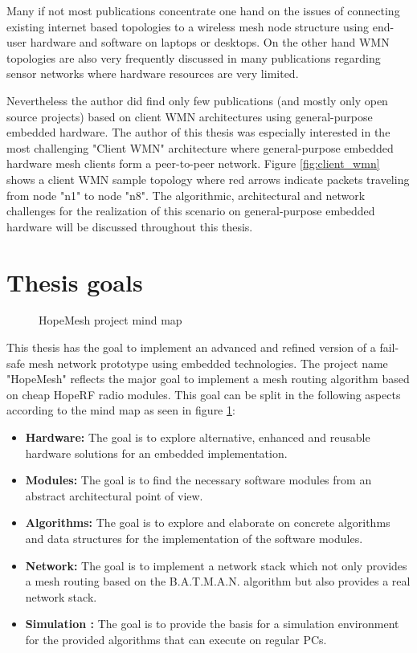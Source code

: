 Many if not most publications concentrate one hand on the issues of connecting existing internet based topologies to a wireless mesh node structure using end-user hardware and software on laptops or desktops. On the other hand WMN topologies are also very frequently discussed in many publications regarding sensor networks where hardware resources are very limited.

Nevertheless the author did find only few publications (and mostly only open source projects) based on client WMN architectures using general-purpose embedded hardware. The author of this thesis was especially interested in the most challenging "Client WMN" architecture where general-purpose embedded hardware mesh clients form a peer-to-peer network. Figure \ref{fig:client_wmn} shows a client WMN sample topology where red arrows indicate packets traveling from node "n1" to node "n8". The algorithmic, architectural and network challenges for the realization of this scenario on general-purpose embedded hardware will be discussed throughout this thesis.

\section{Thesis goals}%
\begin{figure}[H]
\begin{tikzpicture}

\end{tikzpicture}
\caption{HopeMesh project mind map}
\label{fig:mindmap}
\end{figure}

This thesis has the goal to implement an advanced and refined version of a fail-safe mesh network prototype using embedded technologies. The project name "HopeMesh" reflects the major goal to implement a mesh routing algorithm based on cheap HopeRF radio modules. This goal can be split in the following aspects according to the mind map as seen in figure \ref{fig:mindmap}:
\begin{itemize}
    \item \textbf{Hardware: } The goal is to explore alternative, enhanced and reusable hardware solutions for an embedded implementation.
    \item \textbf{Modules:} The goal is to find the necessary software modules from an abstract architectural point of view.
    \item \textbf{Algorithms:} The goal is to explore and elaborate on concrete algorithms and data structures for the implementation of the software modules.
    \item \textbf{Network:} The goal is to implement a network stack which not only provides a mesh routing based on the B.A.T.M.A.N. algorithm but also provides a real network stack.
    \item \textbf{Simulation :} The goal is to provide the basis for a simulation environment for the provided algorithms that can execute on regular PCs.
\end{itemize}

